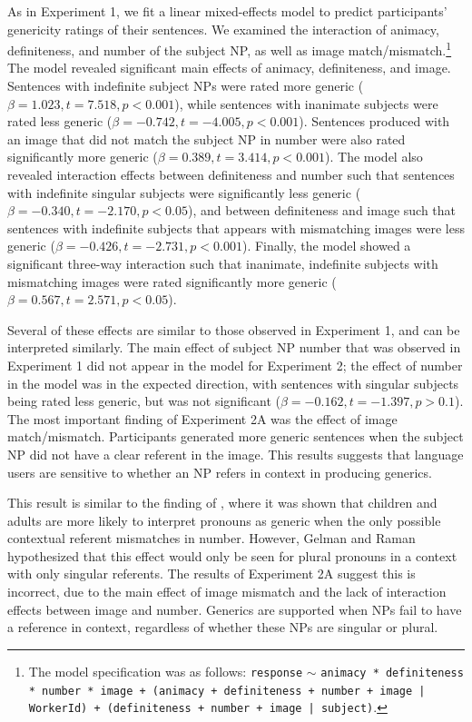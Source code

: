 \documentclass[10pt,letterpaper]{article}
\begin{document}
As in Experiment 1, we fit a linear mixed-effects model to predict participants' genericity ratings of their sentences. We examined the interaction of animacy, definiteness, and number of the subject NP, as well as image match/mismatch.\footnote{The model specification was as follows: \texttt{response} \(\sim\) \texttt{animacy * definiteness * number * image + (animacy + definiteness + number + image | WorkerId) + (definiteness + number + image | subject)}.} The model revealed significant main effects of animacy, definiteness, and image. Sentences with indefinite subject NPs were rated more generic (\(\beta = 1.023, t = 7.518, p < 0.001\)), while sentences with inanimate subjects were rated less generic (\(\beta = -0.742, t = -4.005, p < 0.001\)). Sentences produced with an image that did not match the subject NP in number were also rated significantly more generic (\(\beta = 0.389, t = 3.414, p < 0.001\)). The model also revealed interaction effects between definiteness and number such that sentences with indefinite singular subjects were significantly less generic (\(\beta = -0.340, t= -2.170, p < 0.05\)), and between definiteness and image such that sentences with indefinite subjects that appears with mismatching images were less generic (\(\beta = -0.426, t = -2.731, p < 0.001\)). Finally, the model showed a significant three-way interaction such that inanimate, indefinite subjects with mismatching images were rated significantly more generic (\(\beta = 0.567, t = 2.571, p < 0.05\)).

Several of these effects are similar to those observed in Experiment 1, and can be interpreted similarly. The main effect of subject NP number that was observed in Experiment 1 did not appear in the model for Experiment 2; the effect of number in the model was in the expected direction, with sentences with singular subjects being rated less generic, but was not significant (\(\beta = -0.162, t = -1.397, p > 0.1\)). The most important finding of Experiment 2A was the effect of image match/mismatch. Participants generated more generic sentences when the subject NP did not have a clear referent in the image. This results suggests that language users are sensitive to whether an NP refers in context in producing generics.

This result is similar to the finding of , where it was shown that children and adults are more likely to interpret pronouns as generic when the only possible contextual referent mismatches in number. However, Gelman and Raman hypothesized that this effect would only be seen for plural pronouns in a context with only singular referents. The results of Experiment 2A suggest this is incorrect, due to the main effect of image mismatch and the lack of interaction effects between image and number. Generics are supported when NPs fail to have a reference in context, regardless of whether these NPs are singular or plural.
\end{document}
